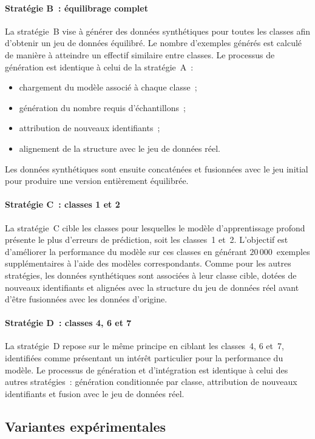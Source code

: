 \documentclass[conference]{IEEEtran}
\begin{document}
\paragraph{Stratégie B~: équilibrage complet}
La stratégie~B vise à générer des données synthétiques pour toutes les classes afin d'obtenir un jeu de données équilibré. Le nombre d'exemples générés est calculé de manière à atteindre un effectif similaire entre classes. Le processus de génération est identique à celui de la stratégie~A~:
\begin{itemize}
    \item chargement du modèle associé à chaque classe~;
    \item génération du nombre requis d'échantillons~;
    \item attribution de nouveaux identifiants~;
    \item alignement de la structure avec le jeu de données réel.
\end{itemize}
Les données synthétiques sont ensuite concaténées et fusionnées avec le jeu initial pour produire une version entièrement équilibrée.

\paragraph{Stratégie C~: classes 1 et 2}
La stratégie~C cible les classes pour lesquelles le modèle d'apprentissage profond présente le plus d'erreurs de prédiction, soit les classes~1 et~2. L'objectif est d'améliorer la performance du modèle sur ces classes en générant $20\,000$~exemples supplémentaires à l'aide des modèles correspondants. Comme pour les autres stratégies, les données synthétiques sont associées à leur classe cible, dotées de nouveaux identifiants et alignées avec la structure du jeu de données réel avant d'être fusionnées avec les données d'origine.

\paragraph{Stratégie D~: classes 4, 6 et 7}
La stratégie~D repose sur le même principe en ciblant les classes~4, 6 et~7, identifiées comme présentant un intérêt particulier pour la performance du modèle. Le processus de génération et d'intégration est identique à celui des autres stratégies~: génération conditionnée par classe, attribution de nouveaux identifiants et fusion avec le jeu de données réel.


\subsection{Variantes expérimentales}
\end{document}
